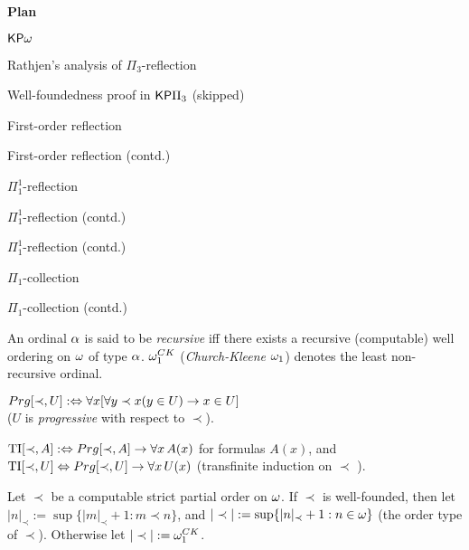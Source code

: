 \documentclass{article}
\begin{document}
\textbf{Plan}

\benu
\item
${\sf KP}\omega$

\item
Rathjen's analysis of $\Pi_{3}$-reflection

Well-foundedness proof in ${\sf KP}\Pi_{3}$ (skipped)

\item
First-order reflection

\item
First-order reflection (contd.)

\item
$\Pi^{1}_{1}$-reflection

\item
$\Pi^{1}_{1}$-reflection (contd.)

\item
$\Pi^{1}_{1}$-reflection (contd.)

\item
$\Pi_{1}$-collection

\item
$\Pi_{1}$-collection (contd.)

\eenu






An ordinal $\alpha$ is said to be \textit{recursive} iff there exists a recursive (computable)
well ordering on $\omega$ of type $\alpha$.
$\omega^{CK}_{1}$ (\textit{Church-Kleene $\omega_{1}$}) denotes the least non-recursive ordinal.

\bdf\label{df:ti}
{\rm
\benu
\item
$Prg[\prec,U]:\Leftrightarrow \forall x[\forall y\prec x(y\in U)\to x\in U]$ 
\\
($U$ is \textit{progressive} with respect to $\prec$).
\item
${\rm TI}[\prec,A] :\Leftrightarrow Prg[\prec,A]\to \forall x\, A(x)$ for formulas $A(x)$, and
\\
${\rm TI}[\prec,U]\Leftrightarrow Prg[\prec,U]\to \forall x\, U(x)$ (transfinite induction on $\prec$ ).
\item
Let $\prec$ be a computable strict partial order on $\omega$.
If $\prec$ is well-founded, then let
$|n|_{\prec}:=\sup\{|m|_{\prec}+1:m\prec n\}$, and
$|\prec|:=\sup\{|n|_{\prec}+1:n\in\omega\}$ (the order type of $\prec$).
Otherwise let $|\prec|:=\omega_{1}^{CK}$.
\eenu
}
\edf
\end{document}
